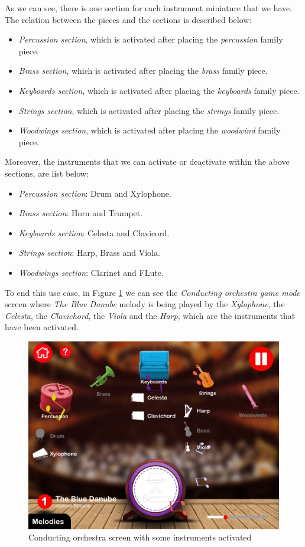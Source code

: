 As we can see, there is one section for each instrument miniature that we have. The relation between the pieces and the sections is described below:
\begin{itemize}
\item \textit{Percussion section}, which is activated after placing the \textit{percussion} family piece.
\item \textit{Brass section}, which is activated after placing the \textit{brass} family piece.
\item \textit{Keyboards section}, which is activated after placing the \textit{keyboards} family piece.
\item \textit{Strings section}, which is activated after placing the \textit{strings} family piece.
\item \textit{Woodwings section}, which is activated after placing the \textit{woodwind} family piece.
\end{itemize}

\newpage

Moreover, the instruments that we can activate or deactivate within the above sections, are list below:
\begin{itemize}
\item \textit{Percussion section}: Drum and Xylophone.
\item \textit{Brass section}: Horn and Trumpet.
\item \textit{Keyboards section}: Celesta and Clavicord.
\item \textit{Strings section}: Harp, Brass and Viola.
\item \textit{Woodwings section}: Clarinet and FLute.
\end{itemize}

To end this use case, in Figure \ref{fig:conducting_some_screen} we can see the \textit{Conducting orchestra game mode} screen where \textit{The Blue Danube} melody is being played by the \textit{Xylophone}, the \textit{Celesta}, the \textit{Clavichord}, the \textit{Viola} and the \textit{Harp}, which are the instruments that have been activated.

\begin{figure}[ht!]
	\centering
	\includegraphics[width=400pt]{graphics/use-case/conducting_some_screen.jpg}
	\caption{Conducting orchestra screen with some instruments activated}
	\label{fig:conducting_some_screen}
\end{figure}
